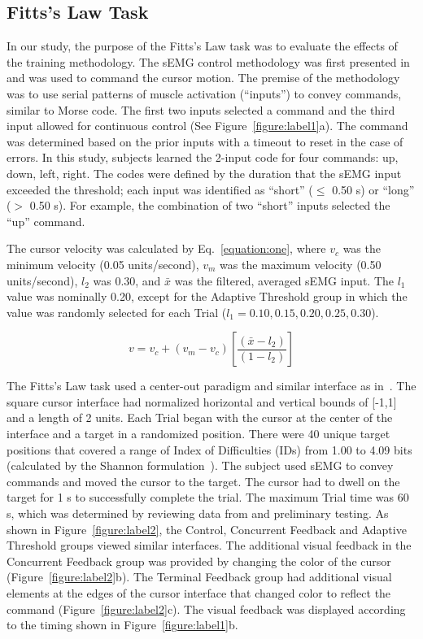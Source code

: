 \subsection{Fitts's Law Task}
In our study, the purpose of the Fitts's Law task was to evaluate the effects of the training methodology.
The sEMG control methodology was first presented in~\citep{RN45} and was used to command the cursor motion.
The premise of the methodology was to use serial patterns of muscle activation (``inputs'') to convey commands, similar to Morse code.
The first two inputs selected a command and the third input allowed for continuous control (See Figure~\ref{figure:label1}a).
The command was determined based on the prior inputs with a timeout to reset in the case of errors.
In this study, subjects learned the 2-input code for four commands: up, down, left, right.
The codes were defined by the duration that the sEMG input exceeded the threshold; each input was identified as ``short'' ($\leq$ 0.50 s) or ``long'' ($>$ 0.50 s).
For example, the combination of two ``short'' inputs selected the ``up'' command.

The cursor velocity was calculated by Eq.~\ref{equation:one}, where $v_c$ was the minimum velocity (0.05 units/second), $v_m$ was the maximum velocity (0.50 units/second), $l_2$ was 0.30, and $\bar{x}$ was the filtered, averaged sEMG input.
The $l_1$ value was nominally 0.20, except for the Adaptive Threshold group in which the value was randomly selected for each Trial ($l_1 = 0.10, 0.15, 0.20, 0.25, 0.30$).

\begin{equation}
	\label{equation:one}
	v= v_c+\left(v_m-v_c\right)\left[\frac{\left(\bar{x}-l_2\right)}{\left(1-l_2\right)}\right]
\end{equation}

The Fitts's Law task used a center-out paradigm and similar interface as in~\citep{RN45}.
The square cursor interface had normalized horizontal and vertical bounds of [-1,1] and a length of 2 units.
Each Trial began with the cursor at the center of the interface and a target in a randomized position.
There were 40 unique target positions that covered a range of Index of Difficulties (IDs) from 1.00 to 4.09 bits (calculated by the Shannon formulation~\citep{RN50}).
The subject used sEMG to convey commands and moved the cursor to the target.
The cursor had to dwell on the target for 1 s to successfully complete the trial.
The maximum Trial time was 60 s, which was determined by reviewing data from \citet{RN45} and preliminary testing.
As shown in Figure~\ref{figure:label2}, the Control, Concurrent Feedback and Adaptive Threshold groups viewed similar interfaces.
The additional visual feedback in the Concurrent Feedback group was provided by changing the color of the cursor (Figure~\ref{figure:label2}b).
The Terminal Feedback group had additional visual elements at the edges of the cursor interface that changed color to reflect the command (Figure~\ref{figure:label2}c).
The visual feedback was displayed according to the timing shown in Figure~\ref{figure:label1}b.

